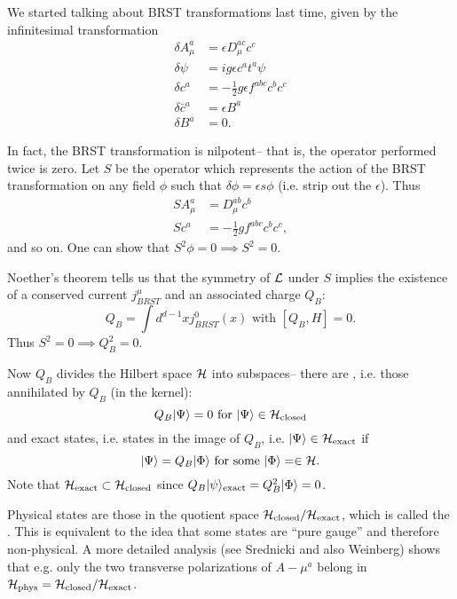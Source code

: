 We started talking about BRST transformations last time, given by the infinitesimal transformation
\begin{align*}
    \delta A_\mu^a &= \epsilon D_\mu^{ac} c^c\\
    \delta \psi &= ig \epsilon c^a t^a \psi\\
    \delta c^a &= -\frac{1}{2} g\epsilon f^{abc} c^b c^c\\
    \delta \bar c^a &= \epsilon B^a\\
    \delta B^a &= 0.
\end{align*}

In fact, the BRST transformation is nilpotent-- that is, the operator performed twice is zero. Let $S$ be the operator which represents the action of the BRST transformation on any field $\phi$ such that $\delta \phi = \epsilon s \phi$ (i.e. strip out the $\epsilon$). Thus
\begin{align}
    SA_\mu^a &= D^{ab}_\mu c^b\\
    Sc^a &= -\frac{1}{2} g f^{abc} c^b c^c,
\end{align}
and so on. One can show that $S^2\phi=0\implies S^2=0$.

Noether's theorem tells us that the symmetry of $\mathcal L$ under $S$ implies the existence of a conserved current $j^\mu_{BRST}$ and an associated charge $Q_B$:
\begin{equation}
    Q_B =\int d^{d-1}x j^0_{BRST}(x)\text{ with }[Q_B,H]=0.
\end{equation}
Thus $S^2=0 \implies Q_B^2=0$.

Now $Q_B$ divides the Hilbert space $\mathcal H$ into subspaces-- there are , i.e. those annihilated by $Q_B$ (in the kernel):
\begin{equation}
    Q_B \lvert\Psi\rangle=0 \text{ for }\lvert\Psi\rangle\in \mathcal H_{\text{closed}}
\end{equation}
and exact states, i.e. states in the image of $Q_B$, i.e. $\lvert\Psi\rangle\in \mathcal H_\text{exact}$ if
\begin{equation}
    \lvert\Psi\rangle = Q_B \lvert\Phi\rangle \text{ for some }\lvert\Phi\rangle =\in \mathcal H.
\end{equation}
Note that $\mathcal H_\text{exact} \subset \mathcal H_\text{closed}$ since $Q_B \lvert\psi\rangle_{\text{exact}}=Q^2_B \lvert\Phi\rangle=0$.

Physical states are those in the quotient space $\mathcal H_\text{closed}/\mathcal H_\text{exact}$, which is called the . This is equivalent to the idea that some states are ``pure gauge'' and therefore non-physical. A more detailed analysis (see Srednicki and also Weinberg) shows that e.g. only the two transverse polarizations of $A-\mu^a$ belong in $\mathcal H_\text{phys}=\mathcal H_\text{closed}/\mathcal H_\text{exact}$.

